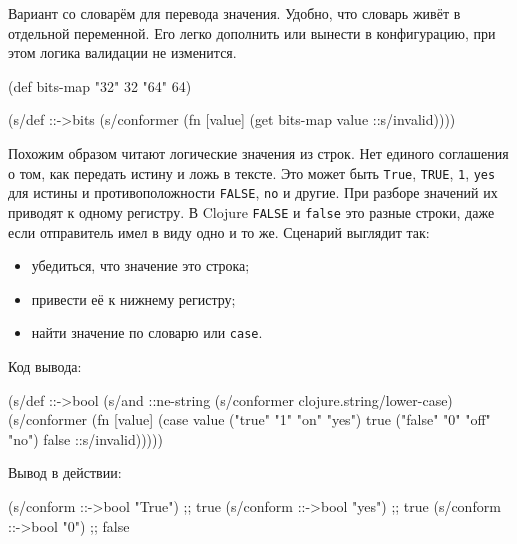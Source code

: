 
Вариант со словарём для перевода значения. Удобно, что словарь живёт в
отдельной переменной. Его легко дополнить или вынести в конфигурацию, при этом
логика валидации не изменится.

\begin{english}
  \begin{clojure}
(def bits-map {"32" 32 "64" 64})

(s/def ::->bits
  (s/conformer
   (fn [value]
     (get bits-map value ::s/invalid))))
  \end{clojure}
\end{english}

Похожим образом читают логические значения из строк. Нет единого соглашения о
том, как передать истину и ложь в тексте. Это может быть \verb|True|,
\verb|TRUE|, \verb|1|, \verb|yes| для истины и противоположности
\verb|FALSE|, \verb|no| и другие. При разборе значений их приводят к одному
регистру. В Clojure \verb|FALSE| и \verb|false| это разные строки, даже если
отправитель имел в виду одно и то же. Сценарий выглядит так:

\begin{itemize}

\item
  убедиться, что значение это строка;

\item
  привести её к нижнему регистру;

\item
  найти значение по словарю или \verb|case|.

\end{itemize}

\noindent
Код вывода:

\begin{english}
  \begin{clojure}
(s/def ::->bool
  (s/and
   ::ne-string
   (s/conformer clojure.string/lower-case)
   (s/conformer
    (fn [value]
      (case value
        ("true" "1" "on" "yes") true
        ("false" "0" "off" "no") false
        ::s/invalid)))))

  \end{clojure}
\end{english}

\noindent
Вывод в действии:

\begin{english}
  \begin{clojure}
(s/conform ::->bool "True") ;; true
(s/conform ::->bool "yes")  ;; true
(s/conform ::->bool "0")    ;; false
  \end{clojure}
\end{english}

